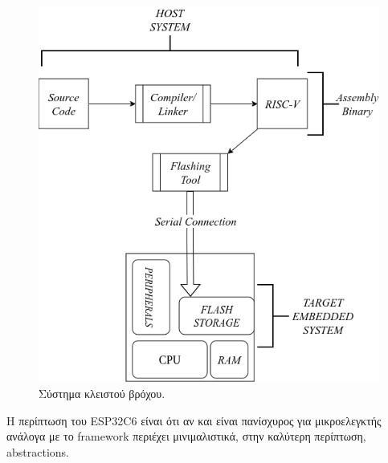 \begin{figure}[h!]
\centering
\includegraphics[scale=0.4]{images/introduction/programming_embedded.png}
\caption{Σύστημα κλειστού βρόχου.}
 \label{fig:embedded_workflow}
\end{figure}

Η περίπτωση του ESP32C6 είναι ότι αν και είναι πανίσχυρος για μικροελεγκτής ανάλογα
με το framework περιέχει μινιμαλιστικά, στην καλύτερη περίπτωση, abstractions.

